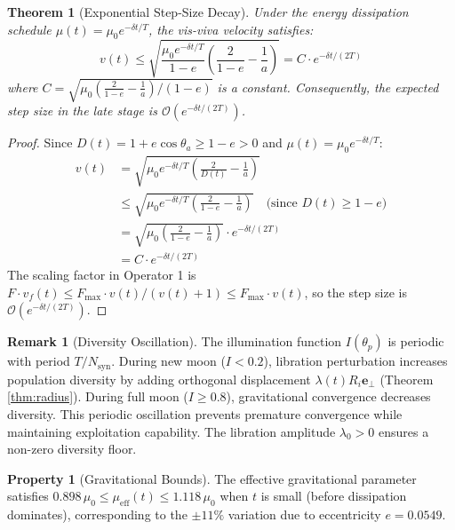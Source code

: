 \documentclass[review]{elsarticle}
\newtheorem{theorem}{Theorem}
\theoremstyle{definition}
\newtheorem{remark}{Remark}
\newtheorem{property}{Property}
\begin{document}
\begin{theorem}[Exponential Step-Size Decay]
\label{thm:decay}
Under the energy dissipation schedule $\mu(t) = \mu_0 e^{-\delta t/T}$, the vis-viva velocity satisfies:
\begin{equation}
v(t) \leq \sqrt{\frac{\mu_0 e^{-\delta t/T}}{1 - e} \left(\frac{2}{1-e} - \frac{1}{a}\right)} = C \cdot e^{-\delta t/(2T)}
\end{equation}
where $C = \sqrt{\mu_0 \left(\frac{2}{1-e} - \frac{1}{a}\right) / (1-e)}$ is a constant. Consequently, the expected step size in the late stage is $\mathcal{O}(e^{-\delta t/(2T)})$.
\end{theorem}
\begin{proof}
Since $D(t) = 1 + e\cos\theta_a \geq 1 - e > 0$ and $\mu(t) = \mu_0 e^{-\delta t/T}$:
\begin{align*}
v(t) &= \sqrt{\mu_0 e^{-\delta t/T} \left(\frac{2}{D(t)} - \frac{1}{a}\right)} \\
&\leq \sqrt{\mu_0 e^{-\delta t/T} \left(\frac{2}{1-e} - \frac{1}{a}\right)} \quad \text{(since } D(t) \geq 1-e \text{)} \\
&= \sqrt{\mu_0 \left(\frac{2}{1-e} - \frac{1}{a}\right)} \cdot e^{-\delta t/(2T)} \\
&= C \cdot e^{-\delta t/(2T)}
\end{align*}
The scaling factor in Operator 1 is $F \cdot v_f(t) \leq F_{\max} \cdot v(t) / (v(t)+1) \leq F_{\max} \cdot v(t)$, so the step size is $\mathcal{O}(e^{-\delta t/(2T)})$.
\end{proof}

\begin{remark}[Diversity Oscillation]
\label{rem:diversity}
The illumination function $I(\theta_p)$ is periodic with period $T/N_{\mathrm{syn}}$. During new moon ($I < 0.2$), libration perturbation increases population diversity by adding orthogonal displacement $\lambda(t) R_i \mathbf{e}_\perp$ (Theorem \ref{thm:radius}). During full moon ($I \geq 0.8$), gravitational convergence decreases diversity. This periodic oscillation prevents premature convergence while maintaining exploitation capability. The libration amplitude $\lambda_0 > 0$ ensures a non-zero diversity floor.
\end{remark}

\begin{property}[Gravitational Bounds]
\label{prop:grav}
The effective gravitational parameter satisfies $0.898\,\mu_0 \leq \mu_{\mathrm{eff}}(t) \leq 1.118\,\mu_0$ when $t$ is small (before dissipation dominates), corresponding to the $\pm 11\%$ variation due to eccentricity $e = 0.0549$.
\end{property}
\end{document}
